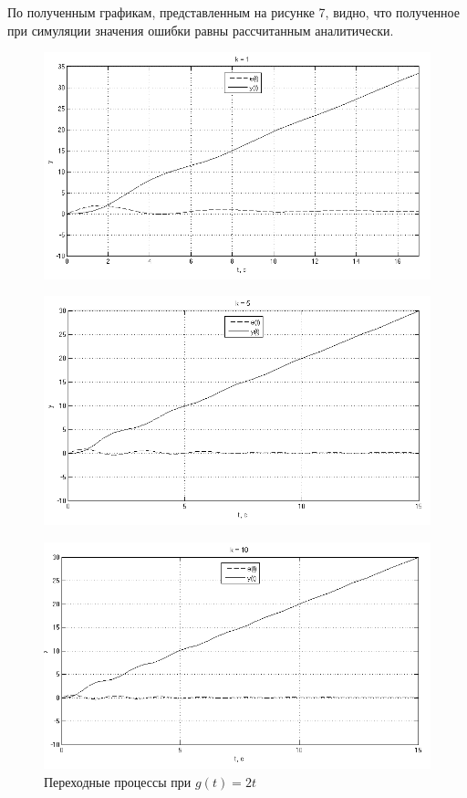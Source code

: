\documentclass[a4paper, 11pt, russian]{article}
\begin{document}
    По полученным графикам, представленным на рисунке 7, видно, что полученное при симуляции значения ошибки равны рассчитанным аналитически.
    \begin{figure}[h!]
        \centering
        \includegraphics[scale = 0.63]{vInput1ast1k.png}
    \end{figure}
    \begin{figure}[h!]
        \centering
        \includegraphics[scale = 0.63]{vInput1ast5k.png}
    \end{figure}
    \begin{figure}[ht!]
        \centering
        \includegraphics[scale = 0.63]{vInput1ast10k.png}
        \caption{Переходные процессы при $g(t) = 2t$}
    \end{figure}
    
\end{document}
